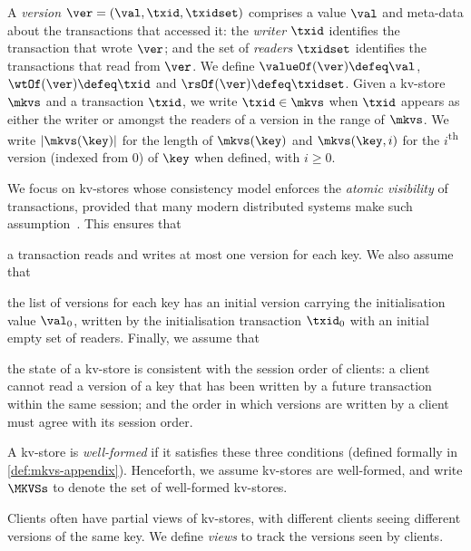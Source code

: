 A \emph{version} $\ver = (\val, \txid, \txidset)$ comprises  a value $\val$
and meta-data about the transactions that accessed it: the \emph{writer} $\txid$ identifies the transaction that wrote $\ver$;
and the set of \emph{readers} $\txidset$ identifies  the  transactions
that read from  $\ver$.
We define $\valueOf(\ver) \defeq \val$,
$\wtOf(\ver) \defeq \txid$ and $\rsOf(\ver) \defeq \txidset$. 
Given a kv-store $\mkvs$ and a transaction $\txid$, we write 
$\txid \in \mkvs$ when $\txid$ appears as either the writer or amongst the readers of a version in the range of $\mkvs$.
We write $\lvert \mkvs(\key) \rvert$ for the length of $\mkvs(\key)$
and $\mkvs(\key, i)$ for the $i$\textsuperscript{th} version (indexed from 0) of $\key$ when defined, with $i \geq 0$.


We focus on kv-stores whose consistency model enforces the \emph{atomic visibility} of transactions,
provided that many modern distributed systems make such assumption~\cite{ramp,rola,cops,wren,redblue,PSI,NMSI,gdur,clocksi,distrsi}.
This ensures that 
\begin{enumerate*}
	\item a transaction reads and writes at most one version for each key.
We also assume that 
	\item the list of versions for each key has an initial version 
carrying the initialisation value $\val_0$,  written by the 
initialisation transaction $\txid_0$ 
with an initial empty set of readers.
Finally, we assume that 
	\item the state of a kv-store is consistent with 
the session order of clients: a client cannot read a version of a key that has 
been written by a future transaction within the same session;  and 
the order in which versions are written by a client must agree 
with its session order. 
\end{enumerate*}
A kv-store is \emph{well-formed} if it satisfies these three conditions (defined formally in \cref{def:mkvs-appendix}). 
Henceforth, we assume kv-stores are well-formed, and write  $\MKVSs$ to denote 
the set of well-formed kv-stores.

Clients often have partial views of kv-stores, 
with different clients seeing 
different versions of the same key.
We define \emph{views} to track the versions seen by clients. 

